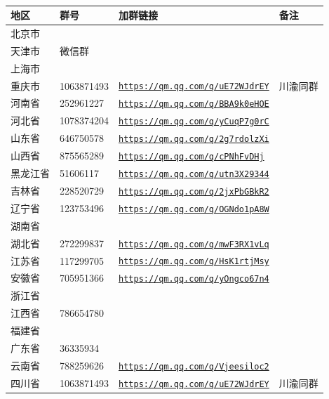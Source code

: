 \documentclass[UTF8,fontset=none,zihao=-4]{ctexart}
\newcommand{\grouplink}[1]{\href{#1}{\nolinkurl{#1}}}
\begin{document}
\begin{center}

%
\\[2.5mm]

{
\begin{tabular}{|C{38mm}|C{36mm}|C{85mm}|C{22mm}|}
\hline
\textbf{地区} & \textbf{群号} & \textbf{加群链接} & \textbf{备注} \\
\hline
北京市 & & & \\
\hline
天津市 & 微信群 & & \\
\hline
上海市 & & & \\
\hline
重庆市 & 1063871493 & \grouplink{https://qm.qq.com/q/uE72WJdrEY} & 川渝同群 \\
\hline
河南省 & 252961227 & \grouplink{https://qm.qq.com/q/BBA9k0eHOE} & \\
\hline
河北省 & 1078374204 & \grouplink{https://qm.qq.com/q/yCuqP7g0rC} & \\
\hline
山东省 & 646750578 & \grouplink{https://qm.qq.com/q/2g7rdolzXi} & \\
\hline
山西省 & 875565289 & \grouplink{https://qm.qq.com/q/cPNhFvDHj} & \\
\hline
黑龙江省 & 51606117 & \grouplink{https://qm.qq.com/q/utn3X29344} & \\
\hline
吉林省 & 228520729 & \grouplink{https://qm.qq.com/q/2jxPbGBkR2} &  \\
\hline
辽宁省 & 123753496 & \grouplink{https://qm.qq.com/q/OGNdo1pA8W} & \\
\hline
湖南省 & & & \\
\hline
湖北省 & 272299837 & \grouplink{https://qm.qq.com/q/mwF3RX1vLq} & \\
\hline
江苏省 & 117299705 & \grouplink{https://qm.qq.com/q/HsK1rtjMsy} & \\
\hline
安徽省 & 705951366 & \grouplink{https://qm.qq.com/q/yOngco67n4} & \\
\hline
浙江省 & &  & \\
\hline
江西省 & 786654780 &  & \\
\hline
福建省 & &  & \\
\hline
广东省 & 36335934 & &  \\
\hline
云南省 & 788259626 & \grouplink{https://qm.qq.com/q/Vjeesiloc2} & \\
\hline
四川省 & 1063871493 & \grouplink{https://qm.qq.com/q/uE72WJdrEY} & 川渝同群 \\

\end{tabular}}
\end{center}
\end{document}
